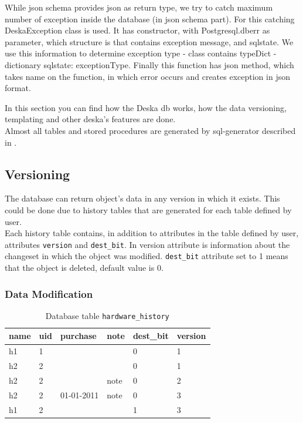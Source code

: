 \documentclass[deska]{subfiles}
\begin{document}
While json schema provides json as return type, we try to catch maximum number of exception inside the database (in
json schema part).
For this catching DeskaException class is used. It has constructor, with Postgresql.dberr as parameter, which structure is that contains exception
message, and sqlstate. We use this information to determine exception type - class contains typeDict - dictionary {sqlstate: exceptionType}.
Finally this function has json method, which takes name on the function, in which error occurs and creates exception in json format.

\label{sec:deska-db}

In this section you can find how the Deska db works, how the data versioning, templating and other deska's features are done.\\
Almost all tables and stored procedures are generated by sql-generator described in .

\subsection{Versioning}
\label{sec:versioning}

The database can return object's data in any version in which it exists. This could be done due to history tables that are generated for each table defined by user.\\
Each history table contains, in addition to attributes in the table defined by user, attributes {\tt version} and {\tt dest\_bit}. In version attribute is information about the changeset in which the object was modified. {\tt dest\_bit} attribute set to 1 means that the object is deleted, default value is 0.\\

\subsubsection{Data Modification}

\begin{longtable}{ l | l | l | l | l | l }
    \caption{Database table {\tt hardware\_history}}
    \label{tab:example-hardwarehist} \\
    name & uid & purchase & note & dest\_bit & version\\
    \hline
    \endhead
    h1 & 1 & & & 0 & 1 \\
    h2 & 2 & & & 0 & 1 \\
    h2 & 2 & & note & 0 & 2 \\
    h2 & 2 & 01-01-2011 & note & 0 & 3 \\
    h1 & 2 & & & 1 & 3 \\
    \hline
\end{longtable}
\end{document}
